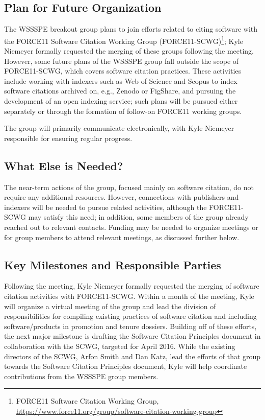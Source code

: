 \subsection{Plan for Future Organization}
\label{SC:plan}

The WSSSPE breakout group plans to join efforts related to citing software with the FORCE11 Software Citation Working Group (FORCE11-SCWG)\footnote{FORCE11 Software Citation Working Group, \url{https://www.force11.org/group/software-citation-working-group}}; Kyle Niemeyer formally requested the merging of these groups following the meeting.
However, some future plans of the WSSSPE group fall outside the scope of FORCE11-SCWG, which covers software citation practices.
These activities include working with indexers such as Web of Science and Scopus to index software citations archived on, e.g., Zenodo or FigShare, and pursuing the development of an open indexing service; such plans will be pursued either separately or through the formation of follow-on FORCE11 working groups.

The group will primarily communicate electronically, with Kyle Niemeyer responsible for ensuring regular progress.

\subsection{What Else is Needed?}

The near-term actions of the group, focused mainly on software citation, do not require any additional resources.
However, connections with publishers and indexers will be needed to pursue related activities, although the FORCE11-SCWG may satisfy this need; in addition, some members of the group already reached out to relevant contacts.
Funding may be needed to organize meetings or for group members to attend relevant meetings, as discussed further below.

\subsection{Key Milestones and Responsible Parties}

Following the meeting, Kyle Niemeyer formally requested the merging of software citation activities with FORCE11-SCWG.
Within a month of the meeting, Kyle will organize a virtual meeting of the group and lead the division of responsibilities for compiling existing practices of software citation and including software\slash products in promotion and tenure dossiers.
Building off of these efforts, the next major milestone is drafting the Software Citation Principles document in collaboration with the SCWG, targeted for April 2016.
While the existing directors of the SCWG, Arfon Smith and Dan Katz, lead the efforts of that group towards the Software Citation Principles document, Kyle will help coordinate contributions from the WSSSPE group members.


